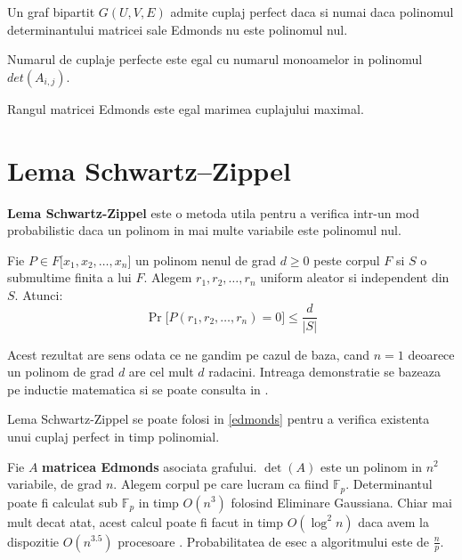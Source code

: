 \begin{thm}
  \label{edmonds}
  Un graf bipartit $G(U, V, E)$ admite cuplaj perfect daca si numai daca
  polinomul determinantului matricei sale Edmonds nu este polinomul nul.
\end{thm}

\begin{clr}
  Numarul de cuplaje perfecte este egal cu numarul monoamelor in polinomul $det(A_{i,j})$.
\end{clr}

\begin{clr}
  Rangul matricei Edmonds este egal marimea cuplajului maximal.
\end{clr}

\pagebreak

\section{Lema Schwartz–Zippel}
\textbf{Lema Schwartz-Zippel} este o metoda utila pentru a verifica intr-un mod
probabilistic daca un polinom in mai multe variabile este polinomul nul.

\begin{thm}
  Fie $P \in F \lbrack x_{1}, x_{2}, \ldots, x_{n} \rbrack$ un polinom nenul de grad $d \geq 0$
  peste corpul $F$ si $S$ o submultime finita a lui $F$. Alegem
  $r_{1}, r_{2}, \ldots, r_{n}$ uniform aleator si independent din $S$. Atunci:
  \begin{equation}
    \Pr \lbrack P(r_{1}, r_{2}, \ldots, r_{n}) = 0 \rbrack \leq \frac{d}{|S|}
  \end{equation}
\end{thm}

Acest rezultat are sens odata ce ne gandim pe cazul de baza, cand $n=1$ deoarece
un polinom de grad $d$ are cel mult $d$ radacini. Intreaga demonstratie se
bazeaza pe inductie matematica si se poate consulta in \cite{schwartzzippel}.

\begin{thm}
  Lema Schwartz-Zippel se poate folosi in \ref{edmonds} pentru a verifica
  existenta unui cuplaj perfect in timp polinomial.
\end{thm}

Fie $A$ \textbf{matricea Edmonds} asociata grafului. $\det(A)$ este un polinom
in $n^{2}$ variabile, de grad $n$. Alegem corpul pe care lucram ca fiind
$\mathbb{F}_{p}$. Determinantul poate fi calculat sub $\mathbb{F}_{p}$ in timp $O(n^{3})$
folosind Eliminare Gaussiana. Chiar mai mult decat atat, acest calcul
poate fi facut in timp $O(\log^{2} n)$ daca avem la dispozitie $O(n^{3.5})$
procesoare \cite{paralleldet}. Probabilitatea de esec a algoritmului este de $\frac{n}{p}$.

